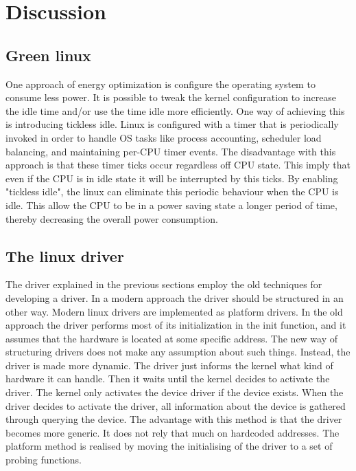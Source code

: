\section{Discussion}

\subsection{Green linux}
One approach of energy optimization is configure the operating system to consume less power. It is possible to tweak the kernel configuration to increase the idle time and/or use the time idle more efficiently. One way of achieving this is introducing tickless idle. Linux is configured with a timer that is periodically invoked in order to handle OS tasks like process accounting, scheduler load balancing, and maintaining per-CPU timer events. The disadvantage with this approach is that these timer ticks occur regardless off CPU state. This imply that even if the CPU is in idle state it will be interrupted by this ticks. By enabling "tickless idle", the linux can eliminate this periodic behaviour when the CPU is idle. This allow the CPU to be in a power saving state a longer period of time, thereby decreasing the overall power consumption. 



\subsection{The linux driver}
The driver explained in the previous sections employ the old techniques for developing a driver. In a modern approach the driver should be structured in an other way. Modern linux drivers are implemented as platform drivers. In the old approach the driver performs most of its initialization in the init function, and it assumes that the hardware is located at some specific address. The new way of structuring drivers does not make any assumption about such things. Instead, the driver is made more dynamic. The driver just informs the kernel what kind of hardware it can handle. Then it waits until the kernel decides to activate the driver. The kernel only activates the device driver if the device exists. When the driver decides to activate the driver, all information about the device is gathered through querying the device. The advantage with this method is that the driver becomes more generic. It does not rely that much on hardcoded addresses. The platform method is realised by moving the initialising  of the driver to a set of probing functions. 

